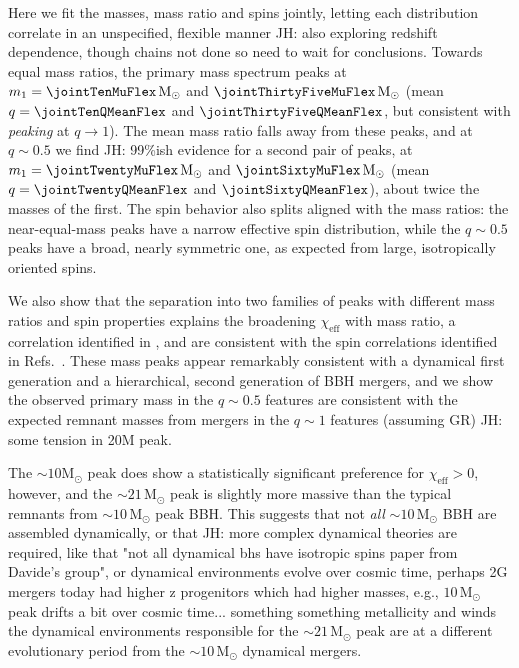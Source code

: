\documentclass[%
 reprint,
 amsmath,amssymb,
 aps,
 prl,
 nofootinbib,nobibnotes,
]{revtex4-2}
\newcommand{\Msun}{\ensuremath{\mathrm{M}_{\odot}}}
\newcommand{\chieff}{\ensuremath{\chi_{\mathrm{eff}}}}
\newcommand{\jh}[1]{{\color{orange}JH: #1}}
\newcommand{\featTen}{10\xspace}
\newcommand{\featTwenty}{21\xspace}
\begin{document}
Here we fit the masses, mass ratio and spins jointly, letting each distribution correlate in an unspecified, flexible manner \jh{also exploring redshift dependence, though chains not done so need to wait for conclusions}. Towards equal mass ratios, the primary mass spectrum peaks at $m_1 = \jointTenMuFlex\,\Msun$ and $\jointThirtyFiveMuFlex\,\Msun$ (mean $q = \jointTenQMeanFlex$ and $\jointThirtyFiveQMeanFlex$, but consistent with \textit{peaking} at $q\to 1$). The mean mass ratio falls away from these peaks, and at $q \sim 0.5$ we find \jh{99\%ish} evidence for a second pair of peaks, at $m_1 = \jointTwentyMuFlex\,\Msun$ and $\jointSixtyMuFlex\,\Msun$ (mean $q = \jointTwentyQMeanFlex$ and $\jointSixtyQMeanFlex$), about twice the masses of the first. The spin behavior also splits aligned with the mass ratios: the near-equal-mass peaks have a narrow effective spin distribution, while the $q \sim 0.5$ peaks have a broad, nearly symmetric one, as expected from large, isotropically oriented spins.

We also show that the separation into two families of peaks with different mass ratios and spin properties explains the broadening $\chieff$ with mass ratio, a correlation identified in \citet{LIGOScientific:2026ctl}, and are consistent with the spin correlations identified in Refs.~\cite{Antonini:2025ilj, Tong:2025xir, Plunkett:2026pxt, Flanagan:2026ayy}. These mass peaks appear remarkably consistent with a dynamical first generation and a hierarchical, second generation of \ac{BBH} mergers, and we show the observed primary mass in the $q\sim 0.5$ features are consistent with the expected remnant masses from mergers in the $q\sim 1$ features (assuming \ac{GR}) \jh{some tension in 20M peak}. 

The $\sim10\Msun$ peak does show a statistically significant preference for $\chieff > 0$, however, and the $\sim \featTwenty\,\Msun$ peak is slightly more massive than the typical remnants from $\sim \featTen\,\Msun$ peak \ac{BBH}. This suggests that not \textit{all} $\sim \featTen\,\Msun$ \ac{BBH} are assembled dynamically, or that \jh{more complex dynamical theories are required, like that "not all dynamical bhs have isotropic spins paper from Davide's group", or dynamical environments evolve over cosmic time, perhaps 2G mergers today had higher z progenitors which had higher masses, e.g., $\featTen\,\Msun$ peak drifts a bit over cosmic time... something something metallicity and winds} the dynamical environments responsible for the $\sim \featTwenty\,\Msun$ peak are at a different evolutionary period from the $\sim \featTen\,\Msun$ dynamical mergers. 
\end{document}
